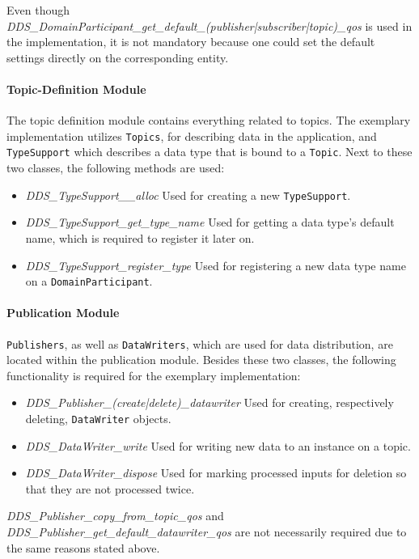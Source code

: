 Even though \textit{DDS\_DomainParticipant\_get\_default\_(publisher|subscriber|topic)\_qos} is used in the implementation, it is not mandatory because one could set the default  settings directly on the corresponding entity.

\paragraph{Topic-Definition Module}
The topic definition module contains everything related to topics.
The exemplary implementation utilizes \texttt{Topics}, for describing data in the application, and \texttt{TypeSupport} which describes a data type that is bound to a \texttt{Topic}.
Next to these two classes, the following methods are used:

\begin{itemize}
\item \textit{DDS\_TypeSupport\_\_alloc} Used for creating a new \texttt{TypeSupport}.
\item \textit{DDS\_TypeSupport\_get\_type\_name} Used for getting a data type's default name, which is required to register it later on.
\item \textit{DDS\_TypeSupport\_register\_type} Used for registering a new data type name on a \texttt{DomainParticipant}.
\end{itemize}


\paragraph{Publication Module}
\texttt{Publishers}, as well as \texttt{DataWriters}, which are used for data distribution, are located within the publication module.
Besides these two classes, the following functionality is required for the exemplary implementation:

\begin{itemize}
\item \textit{DDS\_Publisher\_(create|delete)\_datawriter} Used for creating, respectively deleting, \texttt{DataWriter} objects.
\item \textit{DDS\_DataWriter\_write} Used for writing new data to an instance on a  topic.
\item \textit{DDS\_DataWriter\_dispose} Used for marking processed inputs for deletion so that they are not processed twice.
\end{itemize}

\textit{DDS\_Publisher\_copy\_from\_topic\_qos} and \textit{DDS\_Publisher\_get\_default\_datawriter\_qos} are not necessarily required due to the same reasons stated above.

